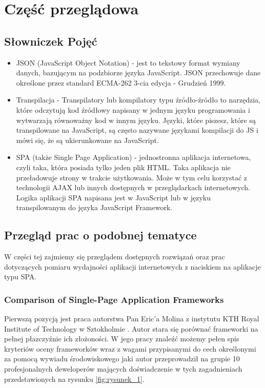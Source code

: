 \chapter{Część przeglądowa}

\section{Słowniczek Pojęć}
\begin{itemize}
	\item JSON \cite{JSON} (JavaScript Object Notation) - jest to tekstowy format wymiany danych, bazującym na podzbiorze języka JavaScript. JSON przechowuje dane określone przez standard ECMA-262 3-cia edycja - Grudzień 1999.
	\item Transpilacja \cite{Transpilator} - Transpilatory lub kompilatory typu źródło-źródło to narzędzia, które odczytują kod źródłowy napisany w jednym języku programowania i wytwarzają równoważny kod w innym języku. Języki, które piszesz, które są transpilowane na JavaScript, są często nazywane językami kompilacji do JS i mówi się, że są ukierunkowane na JavaScript.
	\item SPA \cite{SPA} (także Single Page Application) - jednostronna aplikacja internetowa, czyli taka, która posiada tylko jeden plik HTML. Taka aplikacja nie przeładowuje strony w trakcie użytkowania. Może w tym celu korzystać z technologii AJAX lub innych dostępnych w przeglądarkach internetowych. Logika aplikacji SPA napisana jest w JavaScript lub w języku transpilowanym do języka JavaScript Framework.
\end{itemize}

\section{Przegląd prac o podobnej tematyce}

W części tej zajmiemy się przeglądem dostępnych rozwiązań oraz prac dotyczących pomiaru wydajności aplikacji internetowych z naciskiem na aplikacje typu SPA.

\subsection{Comparison of Single-Page Application Frameworks}

Pierwszą pozycją jest praca autorstwa Pan Eric'a Molina z instytutu KTH Royal Institute of Technology w Sztokholmie \cite{Molin}.
Autor stara się porównać frameworki na pełnej płazczyźnie ich złożoności.
W jego pracy znaleźć możemy pełen spis kryteriów oceny frameworków wraz z wagami przypisanymi do cech określonymi za pomocą wywiadu środowiskowego
jaki autor przeprowadził na grupie 10 profesjonalnych deweloperów mających doświadczenie w tych zagadnieniach przedstawionych na rysunku \ref{fig:rysunek_1}.

